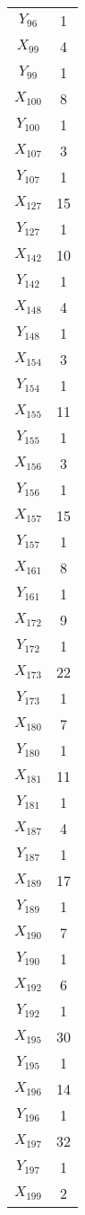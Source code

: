 \documentclass[a4paper,10pt]{article}
\begin{document}
\begin{center}
\begin{longtable}{cc}
$Y_{96}$ & 1 \\
$X_{99}$ & 4 \\
$Y_{99}$ & 1 \\
$X_{100}$ & 8 \\
$Y_{100}$ & 1 \\
$X_{107}$ & 3 \\
$Y_{107}$ & 1 \\
$X_{127}$ & 15 \\
$Y_{127}$ & 1 \\
$X_{142}$ & 10 \\
$Y_{142}$ & 1 \\
$X_{148}$ & 4 \\
$Y_{148}$ & 1 \\
$X_{154}$ & 3 \\
$Y_{154}$ & 1 \\
$X_{155}$ & 11 \\
$Y_{155}$ & 1 \\
$X_{156}$ & 3 \\
$Y_{156}$ & 1 \\
$X_{157}$ & 15 \\
$Y_{157}$ & 1 \\
$X_{161}$ & 8 \\
$Y_{161}$ & 1 \\
$X_{172}$ & 9 \\
$Y_{172}$ & 1 \\
$X_{173}$ & 22 \\
$Y_{173}$ & 1 \\
$X_{180}$ & 7 \\
$Y_{180}$ & 1 \\
$X_{181}$ & 11 \\
$Y_{181}$ & 1 \\
$X_{187}$ & 4 \\
$Y_{187}$ & 1 \\
$X_{189}$ & 17 \\
$Y_{189}$ & 1 \\
$X_{190}$ & 7 \\
$Y_{190}$ & 1 \\
$X_{192}$ & 6 \\
$Y_{192}$ & 1 \\
$X_{195}$ & 30 \\
$Y_{195}$ & 1 \\
$X_{196}$ & 14 \\
$Y_{196}$ & 1 \\
$X_{197}$ & 32 \\
$Y_{197}$ & 1 \\
$X_{199}$ & 2 \\

\end{longtable}
\end{center}
\end{document}
